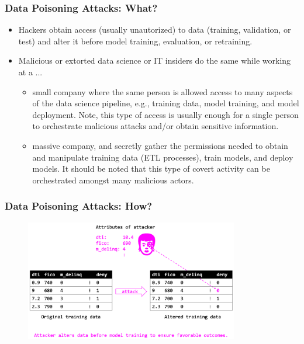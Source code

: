 \documentclass[11pt,
               aspectratio=169,
               hyperref={colorlinks}
               ]{beamer}
\begin{document}
			\begin{frame}
		
				\frametitle{Data Poisoning Attacks: \textbf{What?}}
				
				\begin{itemize}
					\item Hackers obtain access (usually unautorized) to data (training, validation, or test) and alter it before model training, evaluation, or retraining.
					\item Malicious or extorted data science or IT insiders do the same while working at a ...
					\begin{itemize}
						\item small company where the same person is allowed access to many aspects of the data science pipeline, e.g., training data, model training, and model deployment. Note, this type of access
						is usually enough for a single person to orchestrate malicious attacks and/or obtain sensitive information.
						\item massive company, and secretly gather the permissions needed to obtain and manipulate training data (ETL processes), train models, and deploy models. It should be noted
						that this type of covert activity can be orchestrated amongst many malicious actors.
					\end{itemize}
				\end{itemize}
			
			\end{frame}
			
			\begin{frame}
		
				\frametitle{Data Poisoning Attacks: \textbf{How?}}		
			
				\begin{figure}[htb]
					\begin{center}
						\includegraphics[height=150pt]{img/poison.png}
					\end{center}
				\end{figure}	
		
			\end{frame}
		
\end{document}
